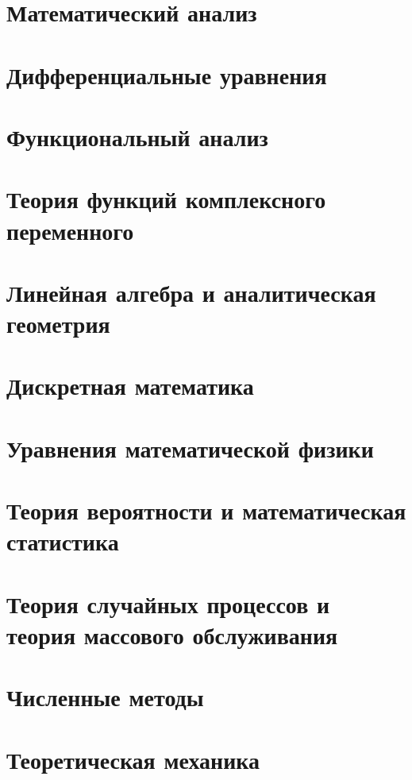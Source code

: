 \documentclass[12pt,a4paper]{article}
\begin{document}
\section{Математический анализ}


\section{Дифференциальные уравнения}


\section{Функциональный анализ}


\section{Теория функций комплексного переменного}


\section{Линейная алгебра и аналитическая геометрия}


\section{Дискретная математика}


\section{Уравнения математической физики}


\section{Теория вероятности и математическая статистика}

\section{Теория случайных процессов и теория массового обслуживания}


\section{Численные методы}


\section{Теоретическая механика}

\end{document}
